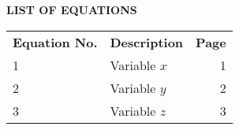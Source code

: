 \begin{center}
{\bf LIST OF EQUATIONS}\\[36pt]
\end{center}
{\baselineskip
\begin{tabular}{l l r}
	\hspace{0.25in}\textbf{Equation No.} & \hspace{0.5in}\textbf{Description} & \hspace{2.25in}\textbf{Page} \\[18pt]
	\hspace{0.75in}1 & \hspace{0.5in}Variable $x$ & 1 \\[12pt]
	\hspace{0.75in}2 & \hspace{0.5in}Variable $y$ & 2 \\[12pt]
	\hspace{0.75in}3 & \hspace{0.5in}Variable $z$ & 3 \\[12pt]
\end{tabular}
}